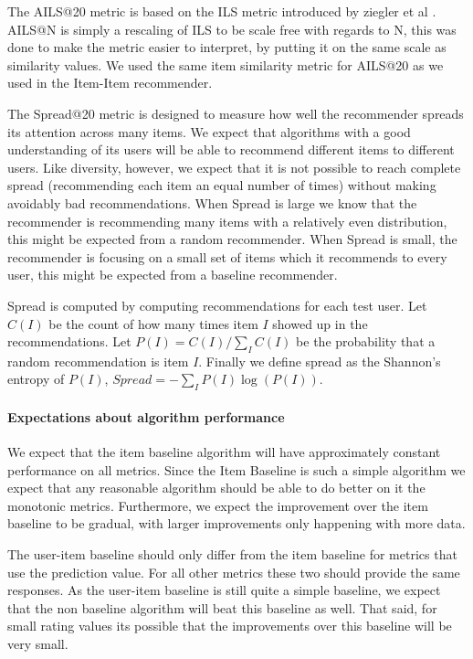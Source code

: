 \documentclass[letterpaper]{sig-alternate}
\begin{document}
  The AILS@20 metric is based on the ILS metric introduced by ziegler et al \cite{zieglerDiversity}.
  AILS@N is simply a rescaling of ILS to be scale free with regards to N, this was done to make the metric easier to interpret, by putting it on the same scale as similarity values.
  We used the same item similarity metric for AILS@20 as we used in the Item-Item recommender.

  The Spread@20 metric is designed to measure how well the recommender spreads its attention across many items.
  We expect that algorithms with a good understanding of its users will be able to recommend different items to different users.
  Like diversity, however, we expect that it is not possible to reach complete spread (recommending each item an equal number of times) without making avoidably bad recommendations.
  When Spread is large we know that the recommender is recommending many items with a relatively even distribution, this might be expected from a random recommender.
  When Spread is small, the recommender is focusing on a small set of items which it recommends to every user, this might be expected from a baseline recommender.

  Spread is computed by computing recommendations for each test user.
  Let $C(I)$ be the count of how many times item $I$ showed up in the recommendations.
  Let $P(I) = C(I) / \sum_I C(I)$ be the probability that a random recommendation is item $I$.
  Finally we define spread as the Shannon's entropy of $P(I)$, $Spread = -\sum_I P(I) \log(P(I))$.

  \paragraph{Expectations about algorithm performance}
  We expect that the item baseline algorithm will have approximately constant performance on all metrics.
  Since the Item Baseline is such a simple algorithm we expect that any reasonable algorithm should be able to do better on it the monotonic metrics.
  Furthermore, we expect the improvement over the item baseline to be gradual, with larger improvements only happening with more data.

  The user-item baseline should only differ from the item baseline for metrics that use the prediction value.
  For all other metrics these two should provide the same responses.
  As the user-item baseline is still quite a simple baseline, we expect that the non baseline algorithm will beat this baseline as well.
  That said, for small rating values its possible that the improvements over this baseline will be very small.
  
\end{document}
